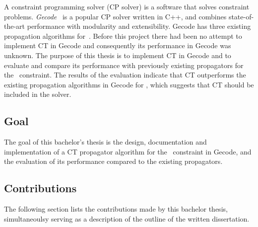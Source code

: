\documentclass[a4paper,11pt]{article}
\newcommand{\Todo}[1]{{\color{blue}#1}}
\newcommand{\Table}{\Constraint{Table}}
\newcommand{\CTpaper}[0]{DBLP:conf/cp/DemeulenaereHLP16}
\numberwithin{equation}{section}
\begin{document}
A constraint programming solver (CP solver) is a software that solves constraint problems.
\emph{Gecode}~\cite{Gecode} is a popular CP solver written in C++, and combines
state-of-the-art performance with modularity and extensibility.
Gecode has three existing propagation algorithms for~\Table.
Before this project there had been no attempt to implement CT in Gecode
and consequently its performance in Gecode was unknown. 
The purpose of this thesis is to implement CT in Gecode and to evaluate
and compare its performance with previously existing propagators for
the \Table~constraint.
The results of the evaluation indicate that CT outperforms
the existing propagation algorithms in Gecode for \Table,
which suggests that CT should be included in the solver.


\subsection{Goal}
\label{intro:goal}
The goal of this bachelor's thesis is the design, documentation and implementation
of a CT propagator algorithm for the \Table~constraint in Gecode,
and the evaluation of its performance compared to the existing propagators.

\subsection{Contributions}
\label{intro:contributions}


The following section lists the contributions made by this bachelor thesis,
simultaneoulsy serving as a
description of the outline of the written dissertation.
\end{document}
